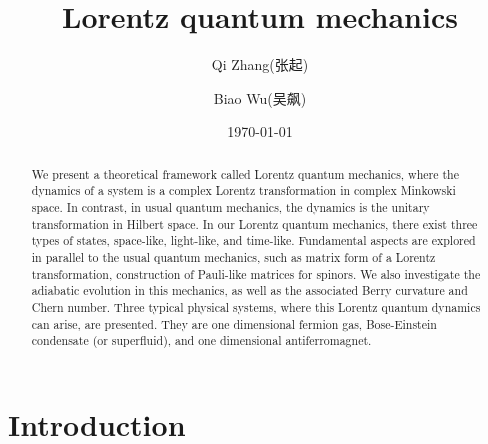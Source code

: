 \documentclass[pra,epsfig,rotate,superscriptaddress,showpacs]{revtex4}
\begin{document}
%
\begin{CJK}{UTF8}{gbsn}
\title
{Lorentz quantum mechanics}

\author{Qi Zhang(张起)}
\author{Biao Wu(吴飙)} %
%
\date{\today}
%
\begin{abstract}
We present a theoretical framework called Lorentz quantum mechanics, where
the dynamics of a system is a complex Lorentz transformation in complex Minkowski space.
In contrast,  in usual quantum mechanics,  the dynamics is the unitary transformation in Hilbert space.
In our Lorentz quantum mechanics, there exist three types of states, space-like, light-like, and time-like.
Fundamental aspects are explored in parallel to the usual quantum mechanics, such as
matrix form of a Lorentz transformation, construction of  Pauli-like matrices for spinors.
We also investigate the adiabatic evolution in this mechanics, as well as the associated Berry curvature and Chern number. Three typical physical systems, where this Lorentz quantum dynamics
can arise,  are presented. They are  one dimensional fermion gas,
Bose-Einstein condensate (or superfluid), and one dimensional antiferromagnet.
\end{abstract}
%

\maketitle
\end{CJK}

\section{Introduction}
\end{document}
